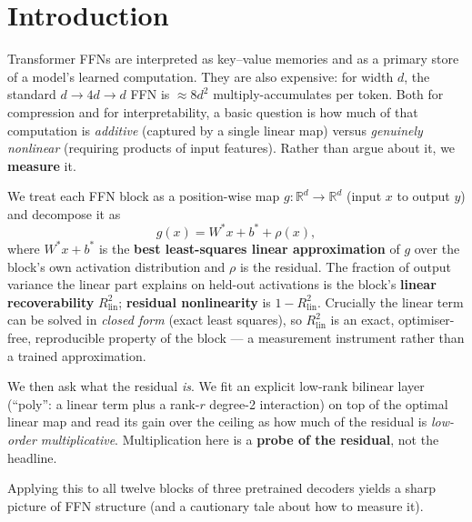 \documentclass{article}
\newcommand{\Rlin}{R^2_{\mathrm{lin}}}
\begin{document}
\section{Introduction}
\label{sec:intro}

Transformer FFNs are interpreted as key--value memories and as a primary store of a model's
learned computation. They are also expensive: for width $d$, the standard $d\!\to\!4d\!\to\!d$
FFN is $\approx 8d^2$ multiply-accumulates per token. Both for compression and for
interpretability, a basic question is how much of that computation is \emph{additive}
(captured by a single linear map) versus \emph{genuinely nonlinear} (requiring products of
input features). Rather than argue about it, we \textbf{measure} it.

We treat each FFN block as a position-wise map $g:\mathbb{R}^d\to\mathbb{R}^d$ (input $x$ to
output $y$) and decompose it as
\begin{equation}
  g(x) = W^{*}x + b^{*} + \rho(x),
\end{equation}
where $W^{*}x + b^{*}$ is the \textbf{best least-squares linear approximation} of $g$ over
the block's own activation distribution and $\rho$ is the residual. The fraction of output
variance the linear part explains on held-out activations is the block's \textbf{linear
recoverability} $\Rlin$; \textbf{residual nonlinearity} is $1-\Rlin$. Crucially the linear
term can be solved in \emph{closed form} (exact least squares), so $\Rlin$ is an exact,
optimiser-free, reproducible property of the block --- a measurement instrument rather than
a trained approximation.

We then ask what the residual \emph{is}. We fit an explicit low-rank bilinear layer
(``poly'': a linear term plus a rank-$r$ degree-2 interaction) on top of the optimal linear
map and read its gain over the ceiling as how much of the residual is \emph{low-order
multiplicative}. Multiplication here is a \textbf{probe of the residual}, not the headline.

Applying this to all twelve blocks of three pretrained decoders yields a sharp picture of
FFN structure (and a cautionary tale about how to measure it).
\end{document}
